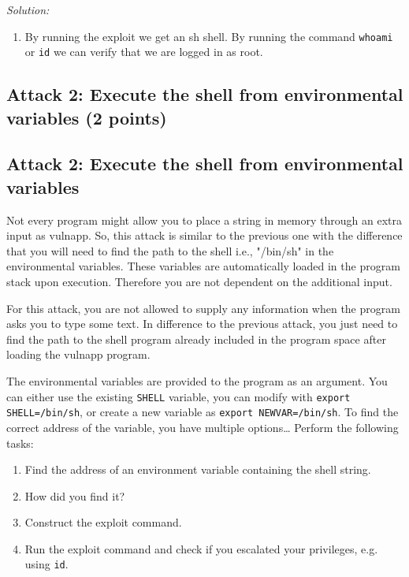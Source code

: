\documentclass[a4paper,11pt]{article}
\newenvironment{solution}%
{\par{\noindent\small\textit{Solution:}}\vspace{-12pt}\begin{framed}}%
{\end{framed}\par}
\begin{document}
\begin{solution}
\begin{enumerate}
		The final exploit is constructed using this one-liner:

		\verb|./vulnapp $(printf "aaaabbbbccccddddeeeezzzz\xd0\xfc\x04\x08aaaa\x21\xbe\x0d\x08")|

		and then giving as input the string "//bin/sh".


   \item 

	   By running the exploit we get an sh shell. By running the command \texttt{whoami} or \texttt{id} we can verify that we are logged in as root.
\end{enumerate}
\end{solution}\fi

\ifsolution 
\subsection*{Attack 2: Execute the shell from environmental variables (2 points)}
\else
\subsection*{Attack 2: Execute the shell from environmental variables}
\fi

Not every program might allow you to place a string in memory through an extra
input as vulnapp. So, this attack is similar to the previous one with the
difference that you will need to find the path to the shell i.e., "/bin/sh" in
the environmental variables.  These variables are automatically loaded in the
program stack upon execution. Therefore you are not dependent on the additional
input.

For this attack, you are not allowed to supply any information when the program asks you to type some text. In difference to the previous attack, you just need to find the path to the shell program already included in the program space after loading the vulnapp program.

The environmental variables are provided to the program as an argument. You can
either use the existing \texttt{SHELL} variable, you can modify with
\texttt{export SHELL=/bin/sh}, or create a new variable as \texttt{export
NEWVAR=/bin/sh}. To find the correct address of the variable, you have multiple
options\dots
Perform the following tasks:

\begin{enumerate}
  \item Find the address of an environment variable containing the shell string.
  \item How did you find it?
  \item Construct the exploit command.
  \item Run the exploit command and check if you escalated your privileges, e.g. using \texttt{id}.
\end{enumerate}
\end{document}
